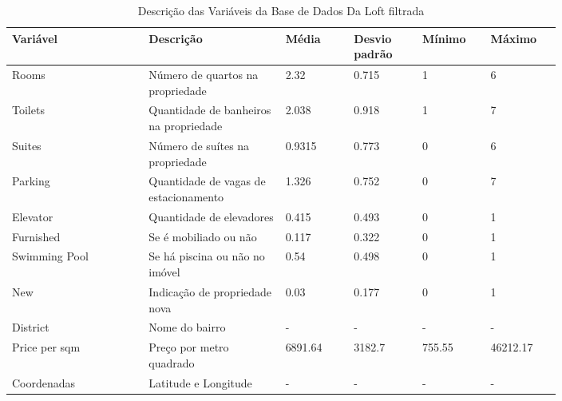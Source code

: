 \begin{table}[H]
    \centering

    
    \begin{tabular}{|m{0.20\linewidth}|m{0.20\linewidth}| m{0.10\linewidth}|m{0.10\linewidth}| m{0.10\linewidth}|m{0.10\linewidth}|}
      \hline
      \textbf{Variável} & \textbf{Descrição} & \textbf{Média} & \textbf{Desvio padrão}  & \textbf{Mínimo} & \textbf{Máximo} \\
      \hline
      Rooms & Número de quartos na propriedade & 2.32 & 0.715 & 1 & 6 \\
      \hline
      Toilets & Quantidade de banheiros na propriedade & 2.038 & 0.918 & 1 & 7 \\
      \hline
       Suites & Número de suítes na propriedade  & 0.9315 & 0.773 & 0 & 6 \\
      \hline
       Parking & Quantidade de vagas de estacionamento & 1.326 & 0.752 & 0 & 7 \\
      \hline
      Elevator & Quantidade de elevadores & 0.415 & 0.493 & 0 & 1 \\
      \hline
      Furnished & Se é mobiliado ou não & 0.117 & 0.322 & 0 & 1 \\
      \hline
      Swimming Pool & Se há piscina ou não no imóvel & 0.54 & 0.498 & 0 & 1 \\
      \hline
      New & Indicação de propriedade nova & 0.03 & 0.177 & 0 & 1 \\
      \hline
      District & Nome do bairro & - & - & - & - \\
      \hline
      Price per sqm & Preço por metro quadrado & 6891.64 & 3182.7 & 755.55	 & 46212.17 \\
      \hline
      Coordenadas & Latitude e Longitude & - & - & - & -\\
      \hline
    \end{tabular}
    \caption{Descrição das Variáveis da Base de Dados Da Loft filtrada}
    \label{tab_variaveis-itbi}
\end{table}

